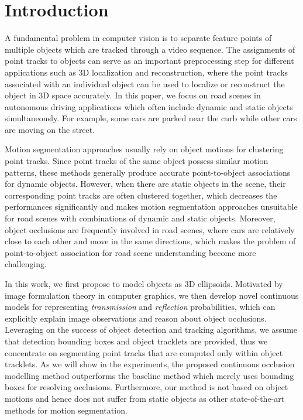 \section{Introduction}

A fundamental problem in computer vision is to separate feature points of multiple objects which are tracked through a video sequence. The assignments of point tracks to objects can serve as an important preprocessing step for different applications such as 3D localization and reconstruction, where the point tracks associated with an individual object can be used to localize or reconstruct the object in 3D space accurately. In this paper, we focus on road scenes in autonomous driving applications which often include dynamic and static objects simultaneously. For example, some cars are parked near the curb while other cars are moving on the street. 

Motion segmentation approaches usually rely on object motions for clustering point tracks. Since point tracks of the same object possess similar motion patterns, these methods generally produce accurate point-to-object associations for dynamic objects. However, when there are static objects in the scene, their corresponding point tracks are often clustered together, which decreases the performances significantly and makes motion segmentation approaches unsuitable for road scenes with combinations of dynamic and static objects. Moreover, object occlusions are frequently involved in road scenes, where cars are relatively close to each other and move in the same directions, which makes the problem of point-to-object association for road scene understanding become more challenging.

In this work, we first propose to model objects as 3D ellipsoids. Motivated by image formulation theory in computer graphics, we then develop novel continuous models for representing \emph{transmission} and \emph{reflection} probabilities, which can explicitly explain image observations and reason about object occlusions. Leveraging on the success of object detection and tracking algorithms, we assume that detection bounding boxes and object tracklets are provided, thus we concentrate on segmenting point tracks that are computed only within object tracklets. As we will show in the experiments, the proposed continuous occlusion modelling method outperforms the baseline method which merely uses bounding boxes for resolving occlusions. Furthermore, our method is not based on object motions and hence does not suffer from static objects as other state-of-the-art methods for motion segmentation.

